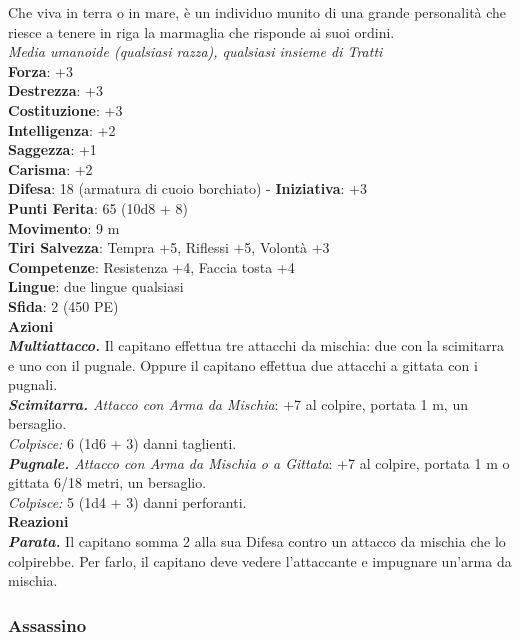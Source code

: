\begin{multicols}{2}
Che viva in terra o in mare, è un individuo munito di una grande personalità che riesce a tenere in riga la marmaglia che risponde ai suoi ordini.\\
\emph{Media umanoide (qualsiasi razza), qualsiasi insieme di Tratti}\\
\textbf{Forza}: +3\\
\textbf{Destrezza}: +3\\
\textbf{Costituzione}: +3\\
\textbf{Intelligenza}: +2\\
\textbf{Saggezza}: +1\\
\textbf{Carisma}: +2\\
\textbf{Difesa}: 18 (armatura di cuoio borchiato) - \textbf{Iniziativa}: +3\\
\textbf{Punti Ferita}: 65 (10d8 + 8)\\
\textbf{Movimento}: 9 m\\
\textbf{Tiri Salvezza}: Tempra +5, Riflessi +5, Volontà +3 \\
\textbf{Competenze}: Resistenza +4, Faccia tosta +4\\
\textbf{Lingue}: due lingue qualsiasi\\
\textbf{Sfida}: 2 (450 PE)\smallskip\\
\smallskip\textbf{Azioni}\\
\emph{\textbf{Multiattacco.}} Il capitano effettua tre attacchi da mischia: due con la scimitarra e uno con il pugnale. Oppure il capitano effettua due attacchi a gittata con i pugnali.\\
\emph{\textbf{Scimitarra.} Attacco con Arma da Mischia}: +7 al colpire, portata 1 m, un bersaglio.\\
\emph{Colpisce:} 6 (1d6 + 3) danni taglienti.\\
\emph{\textbf{Pugnale.} Attacco con Arma da Mischia o a Gittata}: +7 al colpire, portata 1 m o gittata 6/18 metri, un bersaglio.\\
\emph{Colpisce:} 5 (1d4 + 3) danni perforanti.\\
\textbf{Reazioni}\\
\emph{\textbf{Parata.}} Il capitano somma 2 alla sua Difesa contro un attacco da mischia che lo colpirebbe. Per farlo, il capitano deve vedere l'attaccante e impugnare un'arma da mischia.

\subsubsection{Assassino}


\end{multicols}
